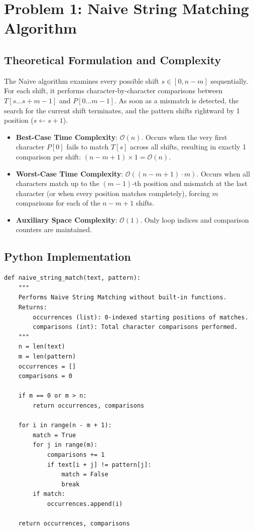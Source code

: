 \documentclass[12pt]{article}
\begin{document}
\section{Problem 1: Naive String Matching Algorithm}

\subsection{Theoretical Formulation and Complexity}
The Naive algorithm examines every possible shift $s \in [0, n - m]$ sequentially. For each shift, it performs character-by-character comparisons between $T[s \dots s+m-1]$ and $P[0 \dots m-1]$. As soon as a mismatch is detected, the search for the current shift terminates, and the pattern shifts rightward by 1 position ($s \leftarrow s + 1$).

\begin{itemize}
    \item \textbf{Best-Case Time Complexity}: $\mathcal{O}(n)$. Occurs when the very first character $P[0]$ fails to match $T[s]$ across all shifts, resulting in exactly 1 comparison per shift: $(n - m + 1) \times 1 = \mathcal{O}(n)$.
    \item \textbf{Worst-Case Time Complexity}: $\mathcal{O}((n - m + 1) \cdot m)$. Occurs when all characters match up to the $(m-1)$-th position and mismatch at the last character (or when every position matches completely), forcing $m$ comparisons for each of the $n - m + 1$ shifts.
    \item \textbf{Auxiliary Space Complexity}: $\mathcal{O}(1)$. Only loop indices and comparison counters are maintained.
\end{itemize}

\subsection{Python Implementation}
\begin{lstlisting}[style=code, caption={Naive String Matching Implementation}]
def naive_string_match(text, pattern):
    """
    Performs Naive String Matching without built-in functions.
    Returns:
        occurrences (list): 0-indexed starting positions of matches.
        comparisons (int): Total character comparisons performed.
    """
    n = len(text)
    m = len(pattern)
    occurrences = []
    comparisons = 0

    if m == 0 or m > n:
        return occurrences, comparisons

    for i in range(n - m + 1):
        match = True
        for j in range(m):
            comparisons += 1
            if text[i + j] != pattern[j]:
                match = False
                break
        if match:
            occurrences.append(i)

    return occurrences, comparisons
\end{lstlisting}
\end{document}
